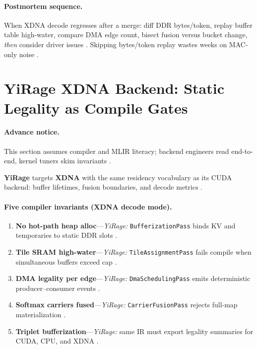 \paragraph{Postmortem sequence.}
When XDNA decode regresses after a merge: diff DDR bytes/token, replay buffer table high-water, compare DMA edge count, bisect fusion versus bucket change, \emph{then} consider driver issues \citep{taxbreak2026,memoryfloor2026,patel2025llminference,amd2024aie,yirage2026}.
Skipping bytes/token replay wastes weeks on MAC-only noise \citep{chen2020compilerbasedhardw}.

\section{YiRage XDNA Backend: Static Legality as Compile Gates}
\label{sec:ch05_yirage_xdna_backend}

\paragraph{Advance notice.}
This section assumes compiler and MLIR literacy; backend engineers read end-to-end, kernel tuners skim invariants \citep{chen2020compilerbasedhardw,yirage2026}.

\textbf{YiRage} targets \textbf{XDNA} with the same residency vocabulary as its CUDA backend: buffer lifetimes, fusion boundaries, and decode metrics \citep{yirage2026,amd2024xdna,amd2024aie}.

\paragraph{Five compiler invariants (XDNA decode mode).}
\begin{enumerate}
\item \textbf{No hot-path heap alloc}---\emph{YiRage:} \texttt{BufferizationPass} binds KV and temporaries to static DDR slots \citep{kwon2023vllm,yirage2026}.
\item \textbf{Tile SRAM high-water}---\emph{YiRage:} \texttt{TileAssignmentPass} fails compile when simultaneous buffers exceed cap \citep{amd2024aie,memoryfloor2026}.
\item \textbf{DMA legality per edge}---\emph{YiRage:} \texttt{DmaSchedulingPass} emits deterministic producer--consumer events \citep{amd2024xdna,semianalysis2024tma}.
\item \textbf{Softmax carriers fused}---\emph{YiRage:} \texttt{CarrierFusionPass} rejects full-map materialization \citep{dao2022flashattention,dao2023flashdecoding}.
\item \textbf{Triplet bufferization}---\emph{YiRage:} same IR must export legality summaries for CUDA, CPU, and XDNA \citep{chen2020compilerbasedhardw,patel2025llminference}.
\end{enumerate}


